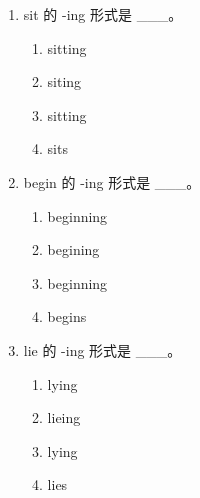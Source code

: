 \documentclass[11pt,a4paper]{ctexart}
\begin{document}
\begin{enumerate}[leftmargin=*,itemsep=4pt]
\begin{enumerate}[label=\Alph*.,leftmargin=2em,itemsep=1pt,topsep=2pt]
\end{enumerate}
\item sit 的 -ing 形式是 \_\_\_。
\begin{enumerate}[label=\Alph*.,leftmargin=2em,itemsep=1pt,topsep=2pt]
\item sitting
\item siting
\item sitting
\item sits
\end{enumerate}
\item begin 的 -ing 形式是 \_\_\_。
\begin{enumerate}[label=\Alph*.,leftmargin=2em,itemsep=1pt,topsep=2pt]
\item beginning
\item begining
\item beginning
\item begins
\end{enumerate}
\item lie 的 -ing 形式是 \_\_\_。
\begin{enumerate}[label=\Alph*.,leftmargin=2em,itemsep=1pt,topsep=2pt]
\item lying
\item lieing
\item lying
\item lies
\end{enumerate}
\end{enumerate}
\end{document}
